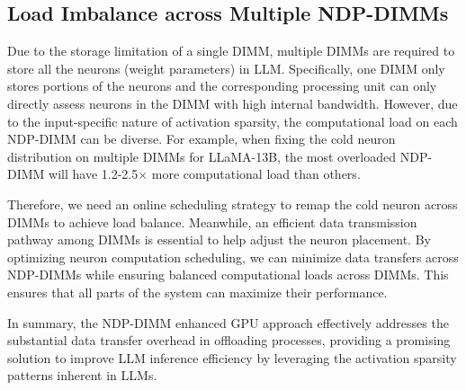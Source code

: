 
\subsection{Load Imbalance across Multiple NDP-DIMMs}
Due to the storage limitation of a single DIMM, multiple DIMMs are required to store all the neurons (weight parameters) in LLM. Specifically, one DIMM only stores portions of the neurons and the corresponding processing unit can only directly assess neurons in the DIMM with high internal bandwidth. However, due to the input-specific nature of activation sparsity, the computational load on each NDP-DIMM can be diverse. For example, when fixing the cold neuron distribution on multiple DIMMs for LLaMA-13B, the most overloaded NDP-DIMM will have 1.2-2.5$\times$ more computational load than others.

Therefore, we need an online scheduling strategy to remap the cold neuron across DIMMs to achieve load balance. Meanwhile, an efficient data transmission pathway among DIMMs is essential to help adjust the neuron placement. By optimizing neuron computation scheduling, we can minimize data transfers across NDP-DIMMs while ensuring balanced computational loads across DIMMs. This ensures that all parts of the system can maximize their performance.

In summary, the NDP-DIMM enhanced GPU approach effectively addresses the substantial data transfer overhead in offloading processes, providing a promising solution to improve LLM inference efficiency by leveraging the activation sparsity patterns inherent in LLMs.
